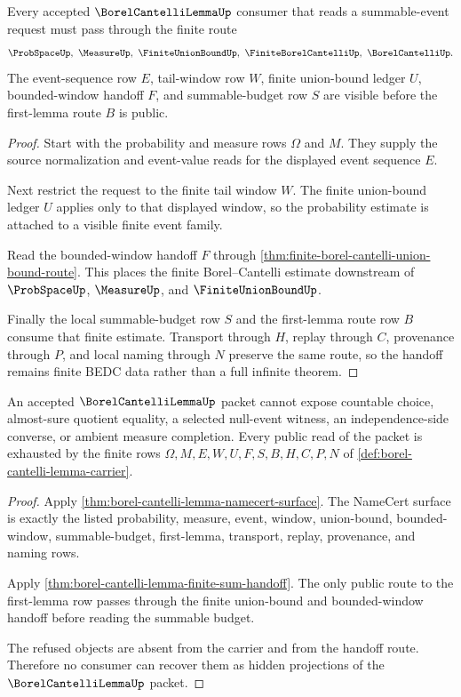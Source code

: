 \begin{theorem}
\label{thm:borel-cantelli-lemma-finite-sum-handoff}
Every accepted $\BorelCantelliLemmaUp$ consumer that reads a summable-event request must pass through the finite route
$$
\ProbSpaceUp,\ \MeasureUp,\ \FiniteUnionBoundUp,\ \FiniteBorelCantelliUp,\ \BorelCantelliUp .
$$
The event-sequence row $E$, tail-window row $W$, finite union-bound ledger $U$, bounded-window handoff $F$, and summable-budget row $S$ are visible before the first-lemma route $B$ is public.
\end{theorem}
\begin{proof}
Start with the probability and measure rows $\Omega$ and $M$. They supply the source normalization and event-value reads for the displayed event sequence $E$.

Next restrict the request to the finite tail window $W$. The finite union-bound ledger $U$ applies only to that displayed window, so the probability estimate is attached to a visible finite event family.

Read the bounded-window handoff $F$ through \autoref{thm:finite-borel-cantelli-union-bound-route}. This places the finite Borel--Cantelli estimate downstream of $\ProbSpaceUp$, $\MeasureUp$, and $\FiniteUnionBoundUp$.

Finally the local summable-budget row $S$ and the first-lemma route row $B$ consume that finite estimate. Transport through $H$, replay through $C$, provenance through $P$, and local naming through $N$ preserve the same route, so the handoff remains finite BEDC data rather than a full infinite theorem.
\end{proof}

\begin{theorem}
\label{thm:borel-cantelli-lemma-no-choice-escape}
An accepted $\BorelCantelliLemmaUp$ packet cannot expose countable choice, almost-sure quotient equality, a selected null-event witness, an independence-side converse, or ambient measure completion. Every public read of the packet is exhausted by the finite rows $\Omega,M,E,W,U,F,S,B,H,C,P,N$ of \autoref{def:borel-cantelli-lemma-carrier}.
\end{theorem}
\begin{proof}
Apply \autoref{thm:borel-cantelli-lemma-namecert-surface}. The NameCert surface is exactly the listed probability, measure, event, window, union-bound, bounded-window, summable-budget, first-lemma, transport, replay, provenance, and naming rows.

Apply \autoref{thm:borel-cantelli-lemma-finite-sum-handoff}. The only public route to the first-lemma row passes through the finite union-bound and bounded-window handoff before reading the summable budget.

The refused objects are absent from the carrier and from the handoff route. Therefore no consumer can recover them as hidden projections of the $\BorelCantelliLemmaUp$ packet.
\end{proof}

